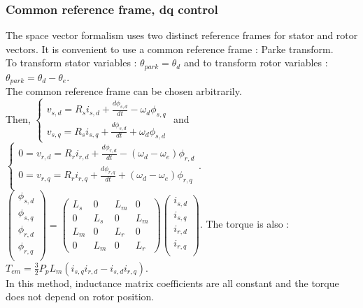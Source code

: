 \documentclass[../main.tex]{subfiles}
\begin{document}
\subsubsection{Common reference frame, dq control}
The space vector formalism uses two distinct reference frames for stator and rotor vectors. It is convenient to use a common reference frame : Parke transform.\\
To transform stator variables : $\theta_{park} = \theta_d$ and to transform rotor variables : $\theta_{park} = \theta_d- \theta_e$.\\
\warning The common reference frame can be chosen arbitrarily. \\

Then, $\begin{cases}
    v_{s,d} = R_s i_{s,d} + \frac{d\phi_{s,d}}{dt} - \omega_d \phi_{s,q}\\
    v_{s,q} = R_s i_{s,q} + \frac{d\phi_{s,d}}{dt} + \omega_d \phi_{s,d}
\end{cases}$ and $\begin{cases}
    0 = v_{r,d} = R_r i_{r,d} + \frac{d\phi_{r,d}}{dt} - (\omega_d - \omega_e) \phi_{r,d}\\
    0 = v_{r,q} = R_r i_{r,q} + \frac{d\phi_{r,q}}{dt} + (\omega_d - \omega_e) \phi_{r,q}\\
\end{cases}$.\\
$\begin{pmatrix}
    \phi_{s,d}\\ \phi_{s,q} \\ \phi_{r,d} \\ \phi_{r,q}\\
\end{pmatrix} = \begin{pmatrix}
    L_s & 0&L_m&0\\0&L_s&0&L_m\\L_m&0&L_r&0\\0&L_m&0&L_r
\end{pmatrix} \begin{pmatrix}
    i_{s,d}\\ i_{s,q} \\ i_{r,d} \\ i_{r,q}\\
\end{pmatrix}$. The torque is also : $T_{em} = \frac{3}{2} P_p L_m (i_{s,q} i_{r,d} - i_{s,d}i_{r,q})$.\\
\warning In this method, inductance matrix coefficients are all constant and the torque does not depend on rotor position.\\
\end{document}
